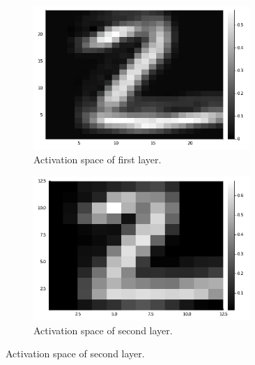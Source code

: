 \documentclass[conference]{IEEEtran}
\theoremstyle{definition}
\theoremstyle{remark}
\theoremstyle{remark}
\begin{document}
\begin{figure}
  \centering
  \begin{subfigure}[b]{0.45\textwidth}
    \centering \includegraphics[width=0.9\textwidth]{figs/act-space-1.pdf}
    \caption{Activation space of first layer.}
  \end{subfigure}
  \begin{subfigure}[b]{0.45\textwidth}
    \centering \includegraphics[width=0.9\textwidth]{figs/act-space-2.pdf}
    \caption{Activation space of second layer.}
  \end{subfigure}


\end{figure}
\end{document}
